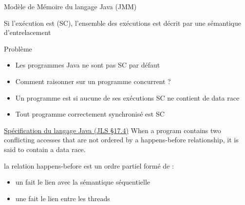 
\begingroup

\begin{frame}{Modèle de Mémoire du langage Java (JMM)}

  \vspace{-3mm}

   Si l'exécution est  (SC),
  l'ensemble des exécutions est décrit par une sémantique d'entrelacement

  \begin{alertblock}{Problème}
    \begin{itemize}
    \item Les programmes Java \alert{ne sont pas} SC par défaut
    \item Comment raisonner sur un programme concurrent ?
    \item<2-> Un programme est  si aucune de ses exécutions SC ne contient de \alert{data race}
    \item<2-> Tout programme correctement synchronisé est SC
    \end{itemize}
  \end{alertblock}

  \vspace{2mm}
  \pause
  
  \begin{shadequote}{\href{https://docs.oracle.com/javase/specs/jls/se7/html/jls-17.html\#jls-17.4}{Spécification du langage Java (JLS §17.4)}}
    When a program contains two conflicting accesses that are not ordered by a \alert<3>{happens-before} relationship, it is said to contain a \alert{data race}.
  \end{shadequote}

  \vspace{2mm}
  \pause
  
    la relation \alert{happens-before} est un ordre partiel formé de :
  \begin{itemize}
  \item un  fait le lien avec la sémantique séquentielle
  \item une  fait le lien entre les threads
  \end{itemize}
  
\end{frame}

\endgroup
\endinput
